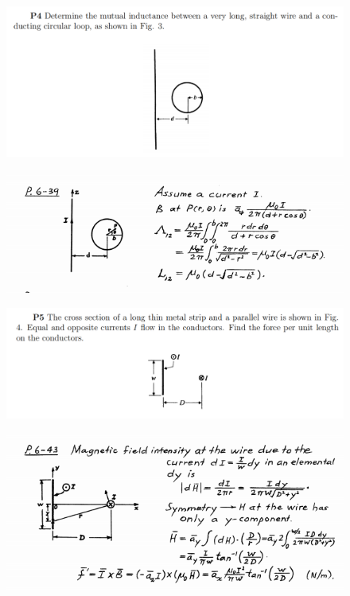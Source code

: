 \documentclass[xcolor={dvipsnames}]{beamer}
\begin{document}
\begin{frame}
\begin{figure}[H]
	\centering
	\includegraphics[width=0.9\linewidth]{7_7.png}
\end{figure}
\pause
\begin{figure}[H]
	\centering
	\includegraphics[width=0.9\linewidth]{7_8.png}
\end{figure}
\end{frame}
\begin{frame}
\begin{figure}[H]
	\centering
	\includegraphics[width=0.9\linewidth]{7_9.png}
\end{figure}
\pause
\begin{figure}[H]
	\centering
	\includegraphics[width=0.9\linewidth]{7_10.png}
\end{figure}
\end{frame}
\end{document}
